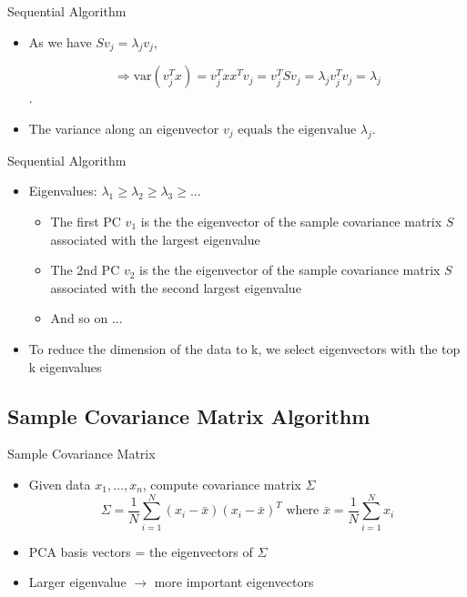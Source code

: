 \documentclass[serif, aspectratio=169]{beamer}
\begin{document}


\begin{frame}{Sequential Algorithm}
    \begin{itemize}
       \item As we have $S v_j = \lambda_j v_j$,

    $$\Rightarrow \text{var}(v_j^T x) = v_j^T x x^{T} v_j =
       v_j^T S v_j =
       \lambda_j v_j^T v_j =
       \lambda_j$$.
    
    \item The variance along an eigenvector  $v_j \text{ equals the eigenvalue } \lambda_j. $
        
    \end{itemize}
\end{frame}

\begin{frame}{Sequential Algorithm}
    \begin{itemize}
       \item Eigenvalues: $\lambda_1 \geq \lambda_2 \geq \lambda_3 \geq ... $
        \begin{itemize}
            \item The first PC $v_1$ is the the eigenvector of the sample covariance matrix $S$ associated with the largest eigenvalue
            \item The 2nd PC $v_2$ is the the eigenvector of the sample covariance
matrix $S$ associated with the second largest eigenvalue
            \item And so on ...
        \end{itemize}
         \item To reduce the dimension of the data to k, we select eigenvectors with the top k eigenvalues
        
    \end{itemize}
\end{frame}


\subsection{Sample Covariance Matrix Algorithm}

\begin{frame}{Sample Covariance Matrix}
    \begin{itemize}
        \item Given data ${x_1, …, x_n}$, compute covariance matrix $\Sigma$
        $$\Sigma = \frac{1}{N} \sum_{i=1}^{N} (x_i - \bar{x})(x_i - \bar{x})^T \text{ where }  \bar{x} = \frac{1}{N} \sum_{i=1}^{N} x_i $$
        \item PCA basis vectors = the eigenvectors of $\Sigma$
        \item Larger eigenvalue $\rightarrow$ more important eigenvectors
    \end{itemize}
\end{frame}
\end{document}
